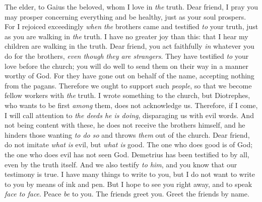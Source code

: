 
\begin{biblechapter} %
 The elder, to Gaius the beloved, whom I love in \textit{the} truth.
\verse Dear friend, I pray you may prosper concerning everything and be healthy, just as your soul prospers.
\verse For I rejoiced exceedingly \textit{when the} brothers came and testified \textit{to} your truth, just as you are walking in \textit{the} truth.
\verse I have no greater joy than this: that I hear my children are walking in the truth.
 Dear friend, you act faithfully \textit{in} whatever you do for the brothers, \textit{even though they are strangers}.
\verse They have testified \textit{to} your love before the church; you will do well to send them on their way in a manner worthy of God.
\verse For they have gone out on behalf of the name, accepting nothing from the pagans.
\verse Therefore we ought to support such \textit{people}, so that we become fellow workers with \textit{the} truth.
 I wrote something to the church, but Diotrephes, who wants to be first \textit{among} them, does not acknowledge us.
\verse Therefore, if I come, I will call attention to \textit{the deeds he is doing}, disparaging us with evil words. And not being content with these, he does not receive the brothers himself, and he hinders those wanting \textit{to do so} and throws \textit{them} out of the church.
\verse Dear friend, do not imitate \textit{what is} evil, but \textit{what is} good. The one who does good is of God; the one who does evil has not seen God.
 Demetrius has been testified to by all, even by the truth itself. And we also testify \textit{to him}, and you know that our testimony is true.
 I have many things to write to you, but I do not want to write to you by means of ink and pen.
\verse But I hope to see you right away, and to speak \textit{face to face}.
\verse Peace \textit{be} to you. The friends greet you. Greet the friends by name.
\end{biblechapter}

